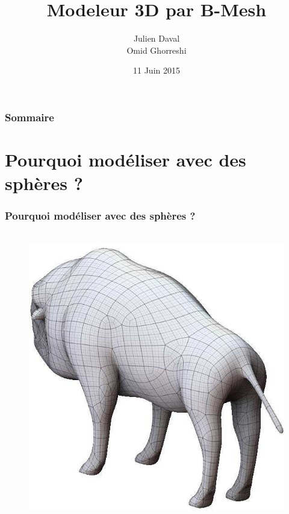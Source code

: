 \documentclass[10pt]{beamer}
\title{Modeleur 3D par B-Mesh}
\author{Julien Daval \\ Omid Ghorreshi}
\institute[Ensimag 2A]{2ème année Ensimag}
\date{11 Juin 2015}
\begin{document}
\begin{frame}
	\titlepage
\end{frame}


\begin{frame}
	\frametitle{Sommaire}
	\tableofcontents
\end{frame}

\section{Pourquoi modéliser avec des sphères ?}

\begin{frame}
	\frametitle{Pourquoi modéliser avec des sphères ?}
	\begin{figure}[H]
		\centering
		\leavevmode
  		\hbox{
  			\includegraphics[scale=0.2]{images/basemesh.jpg}
  			\hspace*{0.5cm} 
}
\end{figure}
\end{frame}
\end{document}
